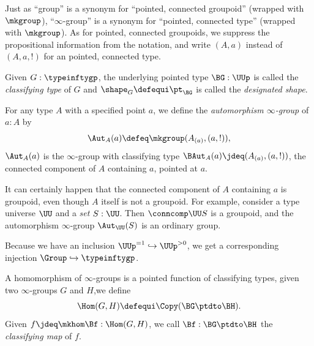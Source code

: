 \begin{remark}\label{rem:pointedtypes}
  Just as ``group'' is a synonym for ``pointed, connected groupoid''
  (wrapped with $\mkgroup$),
  ``$\infty$-group'' is a synonym for ``pointed, connected type''
  (wrapped with $\mkgroup$).
  As for pointed, connected groupoids,
  we suppress the propositional information from the notation,
  and write $(A,a)$ instead of $(A,a,!)$ for an pointed, connected type.
\end{remark}

\begin{definition}\label{def:classifyingspace}
  Given $G:\typeinftygp$,
  the underlying pointed type $\BG : \UUp$
  is called the  \emph{classifying type} of $G$ and $\shape_G\defequi \pt_{\BG}$
  is called the \emph{designated shape}.
\end{definition}

\begin{definition}
  For any type $A$ with a specified point $a$,
  we define the \emph{automorphism $\infty$-group} of $a:A$ by
  \[
    \Aut_A(a) \defeq \mkgroup (A_{(a)},(a,!)),
  \]
  \ie $\Aut_A(a)$ is the $\infty$-group with classifying type
  $\BAut_A(a) \jdeq (A_{(a)},(a,!))$,
  the connected component of $A$ containing $a$, pointed at $a$.
\end{definition}

\begin{remark}\label{rem:autinfgp}
  It can certainly happen that the connected component of $A$ containing $a$
  is groupoid, even though $A$ itself is not a groupoid.
  For example, consider a type universe $\UU$ and a \emph{set} $S:\UU$.
  Then $\conncomp\UU S$ is a groupoid, and the automorphism $\infty$-group
  $\Aut_\UU(S)$ is an ordinary group.

  Because we have an inclusion $\UUp^{=1} \hookrightarrow \UUp^{>0}$,
  we get a corresponding injection $\Group \hookrightarrow \typeinftygp$.
\end{remark}

\begin{definition}
  A homomorphism of $\infty$-groups is a pointed function of classifying types, \ie
  given two $\infty$-groups $G$ and $H$,we define
  \[
    \Hom(G,H)\defequi\Copy(\BG\ptdto\BH).
  \]
  Given $f \jdeq \mkhom\Bf: \Hom(G,H)$, we call
  $\Bf : \BG\ptdto\BH$ the \emph{classifying map} of $f$.
\end{definition}


